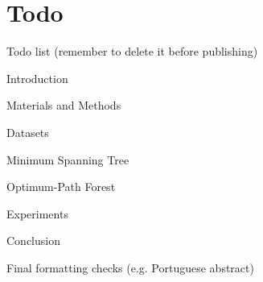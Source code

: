 \chapter[Todo]{Todo}

\begin{itemize}
  \item Todo list (remember to delete it before publishing)
  \begin{todolist}
  \item Introduction
  \item[\done] Materials and Methods
  \begin{todolist}
    \item[\done] Datasets
    \item[\done] Minimum Spanning Tree
    \item[\done] Optimum-Path Forest
  \end{todolist}
  \item Experiments
  \item[\done] Conclusion
  \item Final formatting checks (e.g. Portuguese abstract)
  \end{todolist}
\end{itemize}